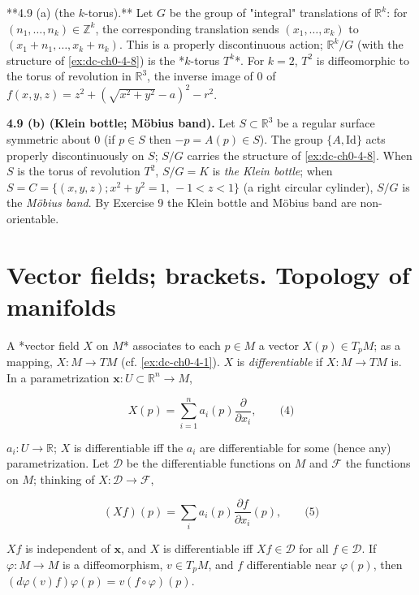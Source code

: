 \begin{example}
  \label{ex:dc-ch0-4-9}
  \notready
  **4.9 (a) (the $k$-torus).** Let $G$ be the group of "integral" translations of
  $\mathbb{R}^k$: for $(n_1,\dots,n_k)\in\mathbb{Z}^k$, the corresponding
  translation sends $(x_1,\dots,x_k)$ to $(x_1+n_1,\dots,x_k+n_k)$.
  This is a properly discontinuous action; $\mathbb{R}^k/G$ (with the structure of
  \cref{ex:dc-ch0-4-8}) is the *$k$-torus $T^k$*. For $k=2$, $T^2$ is diffeomorphic to the
  torus of revolution in $\mathbb{R}^3$, the inverse image of $0$ of
  $f(x,y,z)=z^2+(\sqrt{x^2+y^2}-a)^2-r^2$.
  
  \textbf{4.9 (b) (Klein bottle; Möbius band).} Let $S\subset\mathbb{R}^3$ be a regular
  surface symmetric about $0$ (if $p\in S$ then $-p=A(p)\in S$). The group
  $\{A,\mathrm{Id}\}$ acts properly discontinuously on $S$; $S/G$ carries the
  structure of \cref{ex:dc-ch0-4-8}. When $S$ is the torus of revolution $T^2$, $S/G=K$ is
  \emph{the Klein bottle}; when $S=C=\{(x,y,z); x^2+y^2=1,\,-1<z<1\}$ (a right circular
  cylinder), $S/G$ is the \emph{Möbius band}. By Exercise 9 the Klein bottle and Möbius
  band are non-orientable.
\end{example}

\section{Vector fields; brackets. Topology of manifolds}

\begin{definition}
  \label{def:dc-ch0-5-1}
  \leanok
  A *vector field $X$ on $M$* associates to each $p\in M$ a vector $X(p)\in T_pM$; as
  a mapping, $X:M\to TM$ (cf. \cref{ex:dc-ch0-4-1}). $X$ is \emph{differentiable} if $X:M\to TM$
  is. In a parametrization $\mathbf{x}:U\subset\mathbb{R}^n\to M$,
  
  $$
  X(p)=\sum_{i=1}^n a_i(p)\frac{\partial}{\partial x_i},\qquad\text{(4)}
  $$
  
  $a_i:U\to\mathbb{R}$; $X$ is differentiable iff the $a_i$ are differentiable for
  some (hence any) parametrization. Let $\mathcal{D}$ be the differentiable
  functions on $M$ and $\mathcal{F}$ the functions on $M$; thinking of
  $X:\mathcal{D}\to\mathcal{F}$,
  
  $$
  (Xf)(p)=\sum_i a_i(p)\frac{\partial f}{\partial x_i}(p),\qquad\text{(5)}
  $$
  
  $Xf$ is independent of $\mathbf{x}$, and $X$ is differentiable iff
  $Xf\in\mathcal{D}$ for all $f\in\mathcal{D}$. If $\varphi:M\to M$ is a
  diffeomorphism, $v\in T_pM$, and $f$ differentiable near $\varphi(p)$, then
  $(d\varphi(v)f)\varphi(p)=v(f\circ\varphi)(p)$.
\end{definition}

